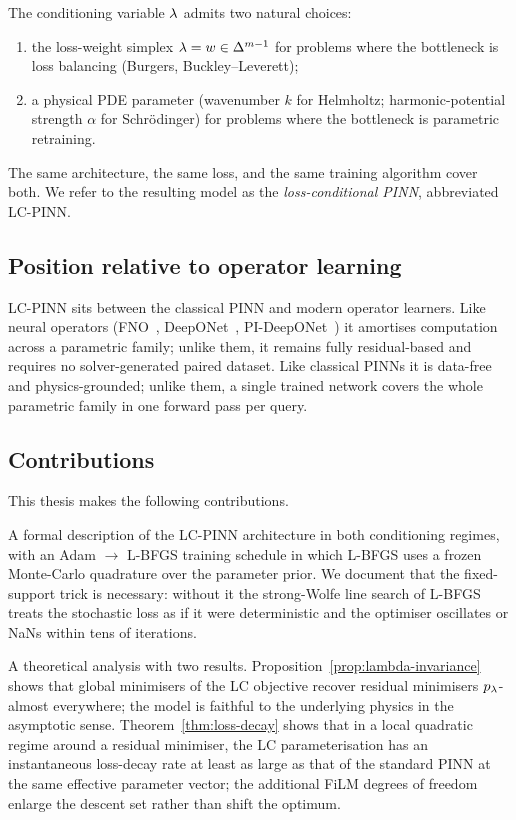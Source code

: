 \documentclass[12pt,a4paper]{extarticle}
\begin{document}
The conditioning variable $\lambda$ admits two natural choices:
\begin{enumerate}
    \item the loss-weight simplex $\lambda = w \in \Delta^{m-1}$ for problems where the bottleneck is loss balancing (Burgers, Buckley--Leverett);
    \item a physical PDE parameter (wavenumber $k$ for Helmholtz; harmonic-potential strength $\alpha$ for Schr\"{o}dinger) for problems where the bottleneck is parametric retraining.
\end{enumerate}
The same architecture, the same loss, and the same training algorithm cover both. We refer to the resulting model as the \emph{loss-conditional PINN}, abbreviated LC-PINN.

\subsection{Position relative to operator learning}

LC-PINN sits between the classical PINN and modern operator learners. Like neural operators (FNO~\cite{li2020fourier}, DeepONet~\cite{lu2021learning}, PI-DeepONet~\cite{wang2021pi-deeponet}) it amortises computation across a parametric family; unlike them, it remains fully residual-based and requires no solver-generated paired dataset. Like classical PINNs it is data-free and physics-grounded; unlike them, a single trained network covers the whole parametric family in one forward pass per query.

\subsection{Contributions}

This thesis makes the following contributions.

A formal description of the LC-PINN architecture in both conditioning regimes, with an Adam $\to$ L-BFGS training schedule in which L-BFGS uses a frozen Monte-Carlo quadrature over the parameter prior. We document that the fixed-support trick is necessary: without it the strong-Wolfe line search of L-BFGS treats the stochastic loss as if it were deterministic and the optimiser oscillates or NaNs within tens of iterations.

A theoretical analysis with two results. Proposition~\ref{prop:lambda-invariance} shows that global minimisers of the LC objective recover residual minimisers $p_\lambda$-almost everywhere; the model is faithful to the underlying physics in the asymptotic sense. Theorem~\ref{thm:loss-decay} shows that in a local quadratic regime around a residual minimiser, the LC parameterisation has an instantaneous loss-decay rate at least as large as that of the standard PINN at the same effective parameter vector; the additional FiLM degrees of freedom enlarge the descent set rather than shift the optimum.
\end{document}
